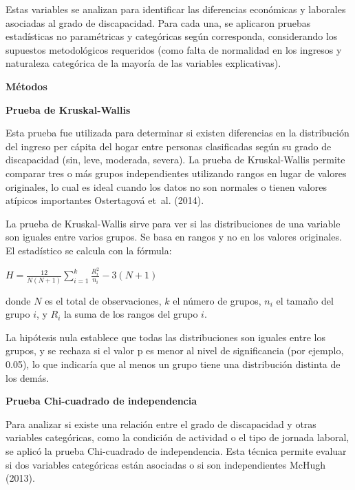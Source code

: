 \documentclass[
  11pt,
  oneside]{article}
\begin{document}
Estas variables se analizan para identificar las diferencias económicas
y laborales asociadas al grado de discapacidad. Para cada una, se
aplicaron pruebas estadísticas no paramétricas y categóricas según
corresponda, considerando los supuestos metodológicos requeridos (como
falta de normalidad en los ingresos y naturaleza categórica de la
mayoría de las variables explicativas).

\textbf{Métodos}

\textbf{Prueba de Kruskal-Wallis}

Esta prueba fue utilizada para determinar si existen diferencias en la
distribución del ingreso per cápita del hogar entre personas
clasificadas según su grado de discapacidad (sin, leve, moderada,
severa). La prueba de Kruskal-Wallis permite comparar tres o más grupos
independientes utilizando rangos en lugar de valores originales, lo cual
es ideal cuando los datos no son normales o tienen valores atípicos
importantes Ostertagová et~al. (2014).

\begin{tcolorbox}[title=Prueba de Kruskal-Wallis]
La prueba de Kruskal-Wallis sirve para ver si las distribuciones de una variable son iguales entre varios grupos. Se basa en rangos y no en los valores originales. El estadístico se calcula con la fórmula:
\begin{center}
$H = \frac{12}{N(N+1)} \sum\limits_{i=1}^{k} \frac{R_i^2}{n_i} - 3(N+1)$
\end{center}
donde \( N \) es el total de observaciones, \( k \) el número de grupos, \( n_i \) el tamaño del grupo \( i \), y \( R_i \) la suma de los rangos del grupo \( i \).
\end{tcolorbox}

La hipótesis nula establece que todas las distribuciones son iguales
entre los grupos, y se rechaza si el valor p es menor al nivel de
significancia (por ejemplo, 0.05), lo que indicaría que al menos un
grupo tiene una distribución distinta de los demás.

\textbf{Prueba Chi-cuadrado de independencia}

Para analizar si existe una relación entre el grado de discapacidad y
otras variables categóricas, como la condición de actividad o el tipo de
jornada laboral, se aplicó la prueba Chi-cuadrado de independencia. Esta
técnica permite evaluar si dos variables categóricas están asociadas o
si son independientes McHugh (2013).
\end{document}
